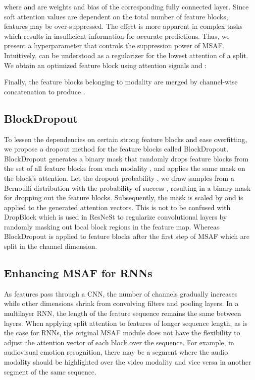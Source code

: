 \documentclass[10pt,twocolumn,letterpaper]{article}
\begin{document}
where  and  are weights and bias of the corresponding fully connected layer.
Since soft attention values are dependent on the total number of feature blocks, features may be over-suppressed. The effect is more apparent in complex tasks which results in insufficient information for accurate predictions. Thus, we present a hyperparameter  that controls the suppression power of MSAF. Intuitively,  can be understood as a regularizer for the lowest attention of a split. We obtain an optimized feature block  using attention signals  and :

Finally, the feature blocks belonging to modality  are merged by channel-wise concatenation to produce .


\subsection{BlockDropout}
To lessen the dependencies on certain strong feature blocks and ease overfitting, we propose a dropout method for the feature blocks called BlockDropout. BlockDropout generates a binary mask that randomly drops feature blocks from the set of all feature blocks from each modality , and applies the same mask on the block’s attention. Let the dropout probability , we draw  samples from a Bernoulli distribution with the probability of success , resulting in a binary mask for dropping out the feature blocks. Subsequently, the mask is scaled by  and is applied to the generated attention vectors. This is not to be confused with DropBlock \cite{NEURIPS2018_7edcfb2d} which is used in ResNeSt to regularize convolutional layers by  randomly masking out local block regions in the feature map. Whereas BlockDropout is applied to feature blocks after the first step of MSAF which are split in the channel dimension.

\subsection{Enhancing MSAF for RNNs}
As features pass through a CNN, the number of channels gradually increases while other dimensions shrink from convolving filters and pooling layers. In a multilayer RNN, the length of the feature sequence remains the same between layers. When applying split attention to features of longer sequence length, as is the case for RNNs, the original MSAF module does not have the flexibility to adjust the attention vector of each block over the sequence. For example, in audiovisual emotion recognition, there may be a segment where the audio modality should be highlighted over the video modality and vice versa in another segment of the same sequence.
\end{document}
